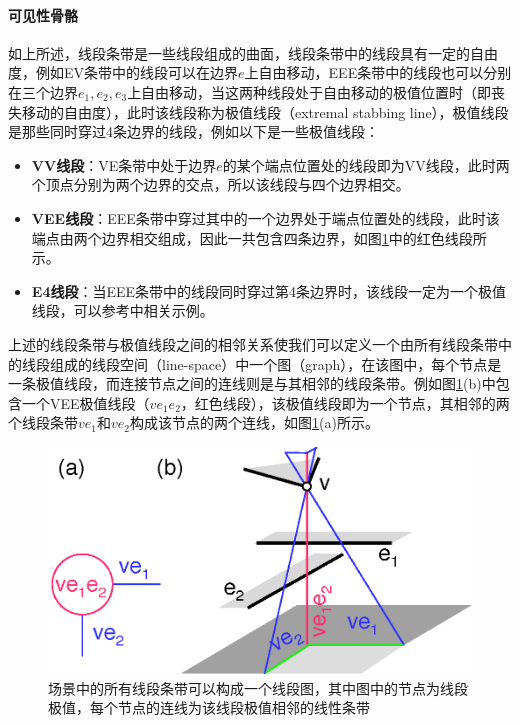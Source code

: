 \paragraph{可见性骨骼}
如上所述，线段条带是一些线段组成的曲面，线段条带中的线段具有一定的自由度，例如EV条带中的线段可以在边界$e$上自由移动，EEE条带中的线段也可以分别在三个边界$e_1,e_2,e_3$上自由移动，当这两种线段处于自由移动的极值位置时（即丧失移动的自由度），此时该线段称为极值线段（extremal stabbing line），极值线段是那些同时穿过4条边界的线段，例如以下是一些极值线段：

\begin{itemize}
	\item \textbf{VV线段}：VE条带中处于边界$e$的某个端点位置处的线段即为VV线段，此时两个顶点分别为两个边界的交点，所以该线段与四个边界相交。
	\item \textbf{VEE线段}：EEE条带中穿过其中的一个边界处于端点位置处的线段，此时该端点由两个边界相交组成，因此一共包含四条边界，如图\ref{f:r-visibility-skeleton}中的红色线段所示。
	\item \textbf{E4线段}：当EEE条带中的线段同时穿过第4条边界时，该线段一定为一个极值线段，可以参考\cite{a:TheVisibilitySkeleton:APowerfulAndEfficientMulti-PurposeGlobalVisibilityTool}中相关示例。
\end{itemize}

上述的线段条带与极值线段之间的相邻关系使我们可以定义一个由所有线段条带中的线段组成的线段空间（line-space）中一个图（graph），在该图中，每个节点是一条极值线段，而连接节点之间的连线则是与其相邻的线段条带。例如图\ref{f:r-visibility-skeleton}(b)中包含一个VEE极值线段（$ve_1e_2$，红色线段），该极值线段即为一个节点，其相邻的两个线段条带$ve_1$和$ve_2$构成该节点的两个连线，如图\ref{f:r-visibility-skeleton}(a)所示。

\begin{figure}
\sidecaption
	\includegraphics[width=.55\textwidth]{figures/r/visibility-skeleton}
	\caption{场景中的所有线段条带可以构成一个线段图，其中图中的节点为线段极值，每个节点的连线为该线段极值相邻的线性条带}
	\label{f:r-visibility-skeleton}
\end{figure}

